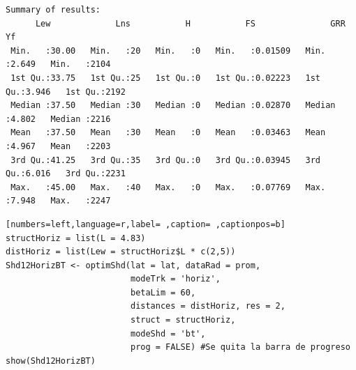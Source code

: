 \begin{verbatim}
Summary of results:
      Lew             Lns           H           FS               GRR              Yf      
 Min.   :30.00   Min.   :20   Min.   :0   Min.   :0.01509   Min.   :2.649   Min.   :2104  
 1st Qu.:33.75   1st Qu.:25   1st Qu.:0   1st Qu.:0.02223   1st Qu.:3.946   1st Qu.:2192  
 Median :37.50   Median :30   Median :0   Median :0.02870   Median :4.802   Median :2216  
 Mean   :37.50   Mean   :30   Mean   :0   Mean   :0.03463   Mean   :4.967   Mean   :2203  
 3rd Qu.:41.25   3rd Qu.:35   3rd Qu.:0   3rd Qu.:0.03945   3rd Qu.:6.016   3rd Qu.:2231  
 Max.   :45.00   Max.   :40   Max.   :0   Max.   :0.07769   Max.   :7.948   Max.   :2247
\end{verbatim}

\begin{lstlisting}[numbers=left,language=r,label= ,caption= ,captionpos=b]
structHoriz = list(L = 4.83)
distHoriz = list(Lew = structHoriz$L * c(2,5))
Shd12HorizBT <- optimShd(lat = lat, dataRad = prom,
                         modeTrk = 'horiz',
                         betaLim = 60,
                         distances = distHoriz, res = 2,
                         struct = structHoriz,
                         modeShd = 'bt',
                         prog = FALSE) #Se quita la barra de progreso
show(Shd12HorizBT)
\end{lstlisting}

